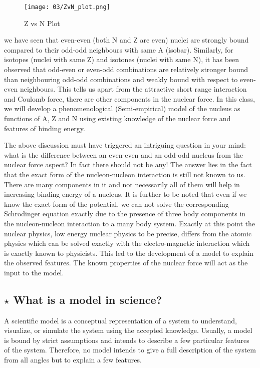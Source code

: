     \pagebreak\begin{figure}
                \centering
                \texttt{[image: 03/ZvN\_plot.png]}
                \caption{Z vs N Plot}
                \label{fig:plot_ZvsN}
            \end{figure}

we have seen that even-even (both N and Z are even) nuclei are strongly bound compared to their odd-odd neighbours with same A (isobar). Similarly, for isotopes (nuclei with same Z) and isotones (nuclei with same N), it has been observed that odd-even or even-odd combinations are relatively stronger bound than neighbouring odd-odd combinations and weakly bound with respect to even-even neighbours. This tells us apart from the attractive short range interaction and Coulomb force, there are other components in the nuclear force. In this class, we will develop a phenomenological (Semi-empirical) model of the nucleus as functions of A, Z and N using existing knowledge of the nuclear force and features of binding energy.



\par The above discussion must have triggered an intriguing question in your mind: what is the difference between an even-even and an odd-odd nucleus from the nuclear force aspect? In fact there should not be any! The answer lies in the fact that the exact form of the nucleon-nucleon interaction is still not known to us. There are many components in it and not necessarily all of them will help in increasing binding energy of a nucleus. It is further to be noted that even if we know the exact form of the potential, we can not solve the corresponding Schrodinger equation exactly due to the presence of three body components in the nucleon-nucleon interaction to a many body system. Exactly at this point the nuclear physics, low energy nuclear physics to be precise, differs from the atomic physics which can be solved exactly with the electro-magnetic interaction which is exactly known to physicists. This led to the development of a model to explain the observed features. The known properties of the nuclear force will act as the input to the model.


    \subsection{$\star$ What is a model in science?}
 A scientific model is a conceptual representation of a system to understand, visualize, or simulate the system using the accepted knowledge. Usually, a model is bound by strict assumptions and intends to describe a few particular features of the system. Therefore, no model intends to give a full description of the system from all angles but to explain a few features. 

